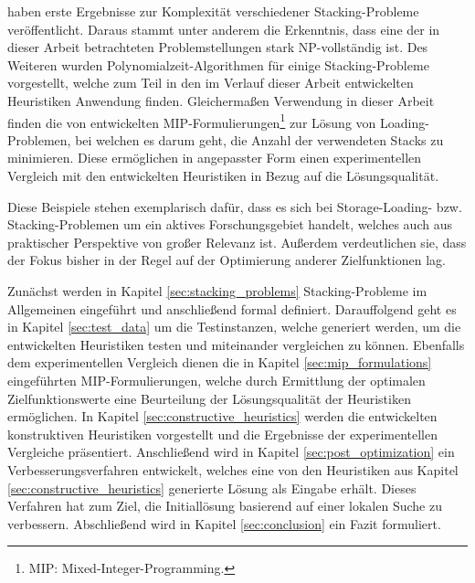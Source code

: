 \citet{Bruns2015} haben erste Ergebnisse zur Komplexität verschiedener Stacking-Probleme veröffentlicht.
Daraus stammt unter anderem die Erkenntnis, dass eine der in dieser Arbeit betrachteten Problemstellungen stark NP-vollständig ist.
Des Weiteren wurden Polynomialzeit-Algorithmen für einige Stacking-Probleme vorgestellt,
welche zum Teil in den im Verlauf dieser Arbeit entwickelten Heuristiken Anwendung finden.\newline
Gleichermaßen Verwendung in dieser Arbeit finden die von \citet{Le2016} entwickelten
MIP-Formulierungen\footnote{MIP: Mixed-Integer-Programming.} zur Lösung von Loading-Problemen, bei welchen es darum geht,
die Anzahl der verwendeten Stacks zu minimieren. Diese ermöglichen in angepasster Form einen experimentellen Vergleich mit
den entwickelten Heuristiken in Bezug auf die Lösungsqualität.

Diese Beispiele stehen exemplarisch dafür, dass es sich bei Storage-Loading- bzw. Stacking-Problemen um
ein aktives Forschungsgebiet handelt, welches auch aus praktischer Perspektive von großer Relevanz ist.
Außerdem verdeutlichen sie, dass der Fokus bisher in der Regel auf der Optimierung anderer Zielfunktionen lag.

Zunächst werden in Kapitel \ref{sec:stacking_problems} Stacking-Probleme im Allgemeinen
eingeführt und anschließend formal definiert.
Da­r­auf­fol­gend geht es in Kapitel \ref{sec:test_data} um die Testinstanzen, welche generiert werden,
um die entwickelten Heuristiken testen und miteinander vergleichen zu können.
Ebenfalls dem experimentellen Vergleich dienen die in Kapitel \ref{sec:mip_formulations} eingeführten MIP-Formulierungen,
welche durch Ermittlung der optimalen Zielfunktionswerte eine Beurteilung der Lösungsqualität der Heuristiken ermöglichen.
In Kapitel \ref{sec:constructive_heuristics} werden die entwickelten konstruktiven Heuristiken vorgestellt und
die Ergebnisse der experimentellen Vergleiche präsentiert. Anschließend wird in Kapitel \ref{sec:post_optimization} ein Verbesserungsverfahren entwickelt, welches eine von den Heuristiken aus Kapitel \ref{sec:constructive_heuristics} generierte Lösung als Eingabe erhält.
Dieses Verfahren hat zum Ziel, die Initiallösung basierend auf einer lokalen Suche
zu verbessern. Abschließend wird in Kapitel \ref{sec:conclusion} ein Fazit formuliert.


\pagebreak
